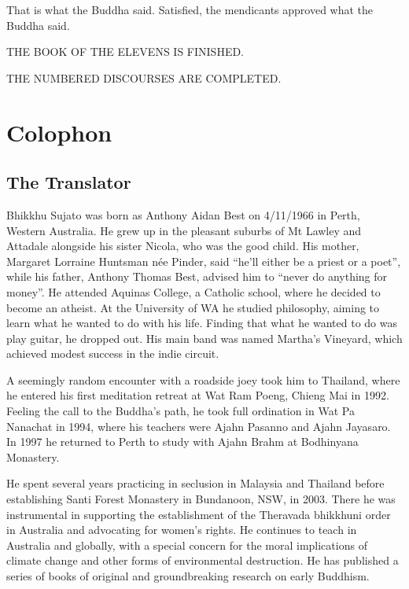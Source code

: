 \documentclass[12pt,openany]{book}%
\newcommand*{\scendbook}[1]{\bigskip\begin{Center}\uppercase{#1}\end{Center}\addvspace{1em}}
\let\oldbackmatter\backmatter
\renewcommand{\backmatter}{%
\chapterfont{\setstretch{.85}\normalfont\centering}%
\sectionfont{\setstretch{.85}\normalfont\BalancedRagged}%
\pagestyle{plainer}%
\oldbackmatter}
\begin{document}
That is what the Buddha said. Satisfied, the mendicants approved what the Buddha said. 

\scendbook{The Book of the Elevens is finished. }

\scendbook{The Numbered Discourses are completed. }

%
\backmatter%
\chapter*{Colophon}

\section*{The Translator}

Bhikkhu Sujato was born as Anthony Aidan Best on 4/11/1966 in Perth, Western Australia. He grew up in the pleasant suburbs of Mt Lawley and Attadale alongside his sister Nicola, who was the good child. His mother, Margaret Lorraine Huntsman née Pinder, said “he’ll either be a priest or a poet”, while his father, Anthony Thomas Best, advised him to “never do anything for money”. He attended Aquinas College, a Catholic school, where he decided to become an atheist. At the University of WA he studied philosophy, aiming to learn what he wanted to do with his life. Finding that what he wanted to do was play guitar, he dropped out. His main band was named Martha’s Vineyard, which achieved modest success in the indie circuit. 

A seemingly random encounter with a roadside joey took him to Thailand, where he entered his first meditation retreat at Wat Ram Poeng, Chieng Mai in 1992. Feeling the call to the Buddha’s path, he took full ordination in Wat Pa Nanachat in 1994, where his teachers were Ajahn Pasanno and Ajahn Jayasaro. In 1997 he returned to Perth to study with Ajahn Brahm at Bodhinyana Monastery. 

He spent several years practicing in seclusion in Malaysia and Thailand before establishing Santi Forest Monastery in Bundanoon, NSW, in 2003. There he was instrumental in supporting the establishment of the Theravada bhikkhuni order in Australia and advocating for women’s rights. He continues to teach in Australia and globally, with a special concern for the moral implications of climate change and other forms of environmental destruction. He has published a series of books of original and groundbreaking research on early Buddhism. 
\end{document}
